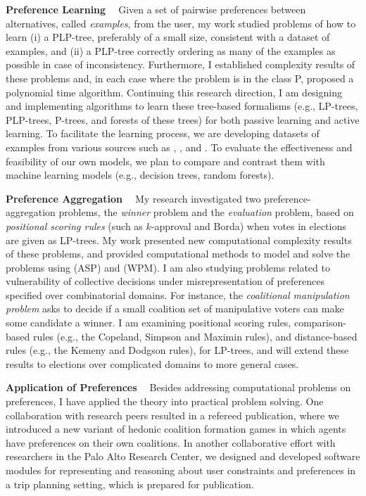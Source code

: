 \smallskip \noindent \textbf{Preference Learning \ }
Given a set of pairwise preferences between alternatives, called \textit{examples}, from the user,
my work\cite{conf/aaai15/LiuT} studied problems of how to learn (i) a PLP-tree, 
preferably of a small size, 
consistent with a dataset of examples, and (ii) a PLP-tree correctly
ordering as many of the examples as possible in case
of inconsistency. Furthermore, I established complexity results
of these problems and, in each case where the problem
is in the class P, proposed a polynomial time algorithm.
Continuing this research direction,
I am designing and implementing algorithms to learn these tree-based 
formalisms (e.g., LP-trees, PLP-trees, P-trees, and forests of these trees) 
for both passive learning and active learning.
To facilitate the learning process, we are developing datasets of examples
from various sources such as ,
, and .
To evaluate the effectiveness and feasibility of our own models, we plan to
compare and contrast them with machine learning models (e.g., decision trees, random forests).

\smallskip \noindent \textbf{Preference Aggregation  \ }
My research investigated two preference-aggregation 
problems, the \emph{winner} problem and the \emph{evaluation} problem,
based on \textit{positional scoring rules} (such as $k$-approval and Borda) 
when votes in elections are given as LP-trees\cite{abs/ijcai13dc/Liu,conf/adt13/LiuT}. 
My work presented new computational complexity results of these problems, and
provided computational methods to model and solve the problems using
 (ASP) and  (WPM).
I am also studying problems related to vulnerability of collective decisions under 
misrepresentation of preferences specified over combinatorial domains.
For instance, the \textit{coalitional manipulation problem}
asks to decide if a small coalition set of manipulative
voters can make some candidate a winner.
I am examining positional scoring rules,
comparison-based rules (e.g., the Copeland, Simpson and Maximin rules), and 
distance-based rules (e.g., the Kemeny and Dodgson rules), for LP-trees,
and will extend these results to elections over complicated domains to more general cases.

\smallskip \noindent \textbf{Application of Preferences  \ }
Besides addressing computational problems on preferences,
I have applied the theory into practical problem solving.
One collaboration with research peers resulted in a refereed publication\cite{conf/adt13/Spradling},
where we introduced a new variant of hedonic coalition formation games in which agents 
have preferences on their own coalitions.
In another collaborative effort with researchers in the Palo Alto Research Center,
we designed and developed software modules for representing and reasoning about user 
constraints and preferences in a trip planning setting, which is prepared
for publication.


